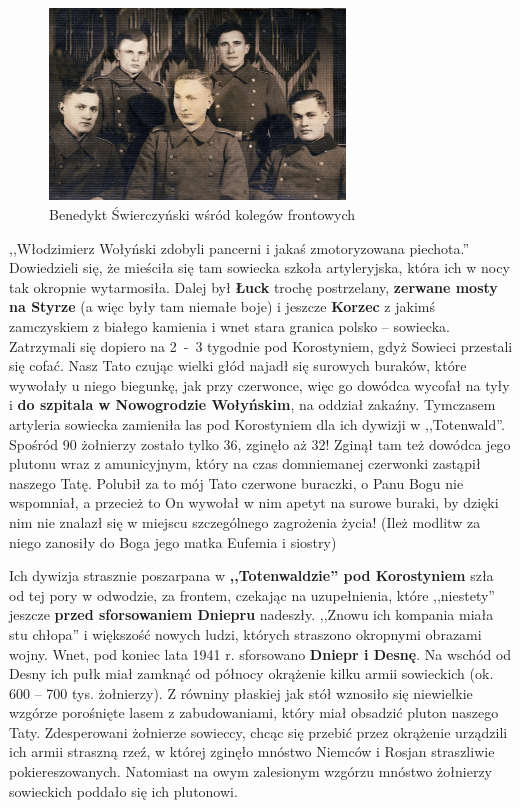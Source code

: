 \begin{figure}[!h]
\begin{center}
\includegraphics[width=0.7\textwidth]{photo/benedykt_swierczynski_wojna.jpg}
\caption{Benedykt Świerczyński wśród kolegów frontowych}
\end{center}
\end{figure}

,,Włodzimierz Wołyński zdobyli pancerni i jakaś zmotoryzowana piechota.'' Dowiedzieli się, że mieściła się tam sowiecka szkoła artyleryjska, która ich w nocy tak okropnie wytarmosiła. Dalej był \textbf{Łuck} trochę postrzelany, \textbf{zerwane mosty na Styrze} (a więc były tam niemałe boje) i jeszcze \textbf{Korzec} z jakimś zamczyskiem z białego kamienia i wnet stara granica polsko – sowiecka. Zatrzymali się dopiero na 2~-~3 tygodnie pod Korostyniem, gdyż Sowieci przestali się cofać. Nasz Tato czując wielki głód najadł się surowych buraków, które wywołały u niego biegunkę, jak przy czerwonce, więc go dowódca wycofał na tyły i \textbf{do szpitala w Nowogrodzie Wołyńskim}, na oddział zakaźny. Tymczasem artyleria sowiecka zamieniła las pod Korostyniem dla ich dywizji w ,,Totenwald''. Spośród 90 żołnierzy zostało tylko 36, zginęło aż 32! Zginął tam też dowódca jego plutonu wraz z amunicyjnym, który na czas domniemanej czerwonki zastąpił naszego Tatę. Polubił za to mój Tato czerwone buraczki, o Panu Bogu nie wspomniał, a przecież to On wywołał w nim apetyt na surowe buraki, by dzięki nim nie znalazł się w miejscu szczególnego zagrożenia życia! (Ileż modlitw za niego zanosiły do Boga jego matka Eufemia i siostry)

Ich dywizja strasznie poszarpana w \textbf{,,Totenwaldzie'' pod Korostyniem} szła od tej pory w odwodzie, za frontem, czekając na uzupełnienia, które ,,niestety'' jeszcze \textbf{przed sforsowaniem Dniepru} nadeszły. ,,Znowu ich kompania miała stu chłopa'' i większość nowych ludzi, których straszono okropnymi obrazami wojny. Wnet, pod koniec lata 1941 r. sforsowano \textbf{Dniepr i Desnę}. Na wschód od Desny ich pułk miał zamknąć od północy okrążenie kilku armii sowieckich (ok. 600 – 700 tys. żołnierzy). Z równiny płaskiej jak stół wznosiło się niewielkie wzgórze porośnięte lasem z zabudowaniami, który miał obsadzić pluton naszego Taty. Zdesperowani żołnierze sowieccy, chcąc się przebić przez okrążenie urządzili ich armii straszną rzeź, w której zginęło mnóstwo Niemców i Rosjan straszliwie pokiereszowanych. Natomiast na owym zalesionym wzgórzu mnóstwo żołnierzy sowieckich poddało się ich plutonowi.

